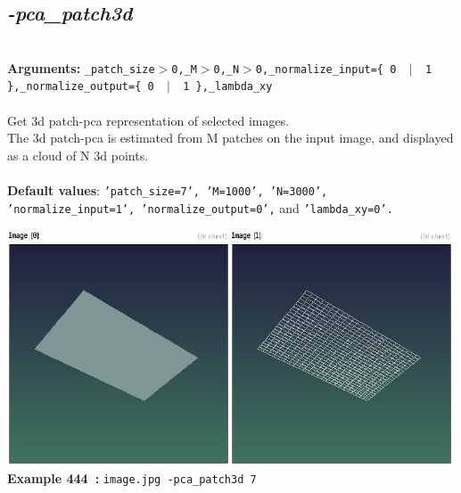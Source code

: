 \documentclass[a4paper,11pt,twoside]{book}
\begin{document}
\subsection{\emph{-pca\_patch3d} }\vspace*{-0.5em}
~\\\textbf{Arguments: } 
{\small \texttt{\_patch\_size$>$0,\_M$>$0,\_N$>$0,\_normalize\_input=\{ 0 ~$|$~ 1 \},\_normalize\_output=\{ 0 ~$|$~ 1 \},\_lambda\_xy}}\\~\\
Get 3d patch-pca representation of selected images.
~\\The 3d patch-pca is estimated from M patches on the input image, and displayed as a cloud of N 3d points.
~\\~\\\textbf{Default values}: {\small \texttt{'patch\_size=7', 'M=1000', 'N=3000', 'normalize\_input=1', 'normalize\_output=0',} and \texttt{'lambda\_xy=0'.}}
\begin{center}\includegraphics[keepaspectratio=true,height=7cm,width=\textwidth]{img/gmic_def444.jpg}\\
{\footnotesize \textbf{Example 444~:} \texttt{image.jpg -pca\_patch3d 7}}
\end{center}
\end{document}
